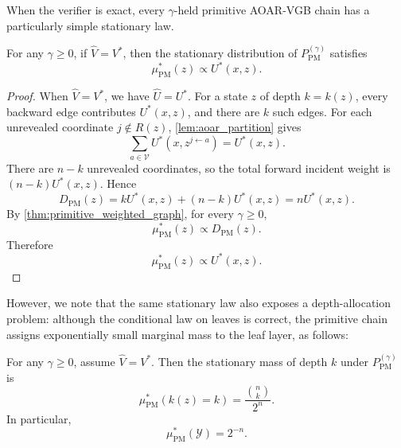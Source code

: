 \documentclass{article}
\numberwithin{theorem}{section}
\numberwithin{proposition}{section}
\numberwithin{corollary}{section}
\numberwithin{lemma}{section}
\numberwithin{conjecture}{section}
\numberwithin{remark}{section}
\numberwithin{definition}{section}
\numberwithin{assumption}{section}
\numberwithin{example}{section}
\newcommand{\calV}{{\mathcal{V}}}
\newcommand{\calY}{{\mathcal{Y}}}
\begin{document}
When the verifier is exact, every $\gamma$-held primitive AOAR-VGB chain has a particularly simple stationary law.

\begin{corollary}
\label{cor:primitive_exact_stationary}
For any $\gamma\ge 0$, if $\widehat V=V^*$, then the stationary distribution of $P_{\mathrm{PM}}^{(\gamma)}$ satisfies
\begin{equation*}
    \mu_{\mathrm{PM}}^*(z) \propto U^*(x,z).
\end{equation*}
\end{corollary}

\begin{proof}
When $\widehat V=V^*$, we have $\widehat U=U^*$. For a state $z$ of depth $k=k(z)$, every backward edge contributes $U^*(x,z)$, and there are $k$ such edges. For each unrevealed coordinate $j\notin R(z)$, \cref{lem:aoar_partition} gives
\begin{equation*}
    \sum_{a\in\calV} U^*(x,z^{j\leftarrow a}) = U^*(x,z).
\end{equation*}
There are $n-k$ unrevealed coordinates, so the total forward incident weight is $(n-k)U^*(x,z)$. Hence
\begin{equation*}
    D_{\mathrm{PM}}(z) = kU^*(x,z)+(n-k)U^*(x,z) = nU^*(x,z).
\end{equation*}
By \cref{thm:primitive_weighted_graph}, for every $\gamma\ge 0$,
\begin{equation*}
    \mu_{\mathrm{PM}}^*(z)\propto D_{\mathrm{PM}}(z).
\end{equation*}
Therefore
\begin{equation*}
    \mu_{\mathrm{PM}}^*(z)\propto U^*(x,z).
\end{equation*}
\end{proof}

However, we note that the same stationary law also exposes a depth-allocation problem: although the conditional law on leaves is correct, the primitive chain assigns exponentially small marginal mass to the leaf layer, as follows:

\begin{proposition}
\label{prop:primitive_leaf_dilution}
For any $\gamma\ge 0$, assume $\widehat V=V^*$. Then the stationary mass of depth $k$ under $P_{\mathrm{PM}}^{(\gamma)}$ is
\begin{equation*}
    \mu_{\mathrm{PM}}^*(k(z)=k) = \frac{\binom{n}{k}}{2^n}.
\end{equation*}
In particular,
\begin{equation*}
    \mu_{\mathrm{PM}}^*(\calY) = 2^{-n}.
\end{equation*}
\end{proposition}
\end{document}
